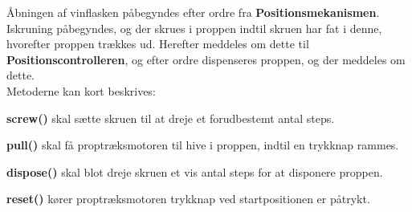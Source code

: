 \noindent Åbningen af vinflasken påbegyndes efter ordre fra \textbf{Positionsmekanismen}. Iskruning påbegyndes, og der skrues i proppen indtil skruen har fat i denne, hvorefter proppen trækkes ud. Herefter meddeles om dette til \textbf{Positionscontrolleren}, og efter ordre dispenseres proppen, og der meddeles om dette. \\

Metoderne kan kort beskrives:

\textbf{screw()} skal sætte skruen til at dreje et forudbestemt antal steps.

\textbf{pull()} skal få proptræksmotoren til hive i proppen, indtil en trykknap rammes.

\textbf{dispose()} skal blot dreje skruen et vis antal steps for at disponere proppen.

\textbf{reset()} kører proptræksmotoren trykknap ved startpositionen er påtrykt.